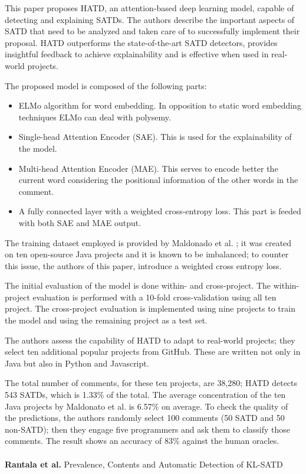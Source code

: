 This paper proposes HATD, an attention-based deep learning model, capable of detecting and explaining SATDs. The authors describe the important aspects of SATD that need to be analyzed and taken care of to successfully implement their proposal. HATD outperforms the state-of-the-art SATD detectors, provides insightful feedback to achieve explainability and is effective when used in real-world projects.

The proposed model is composed of the following parts:
\begin{itemize}
    \item ELMo algorithm for word embedding. In opposition to static word embedding techniques ELMo can deal with polysemy.
    \item Single-head Attention Encoder (SAE). This is used for the explainability of the model.
    \item Multi-head Attention Encoder (MAE). This serves to encode better the current word considering the positional information of the other words in the comment.
    \item A fully connected layer with a weighted cross-entropy loss. This part is feeded with both SAE and MAE output. 
\end{itemize}

The training dataset employed is provided by Maldonado et al. \cite{maldonado2017using}; it was created on ten open-source Java projects and it is known to be imbalanced; to counter this issue, the authors of this paper, introduce a weighted cross entropy loss. 

The initial evaluation of the model is done within- and cross-project. The within-project evaluation is performed with a 10-fold cross-validation using all ten project. The cross-project evaluation is implemented using nine projects to train the model and using the remaining project as a test set.

The authors assess the capability of HATD to adapt to real-world projects; they select ten additional popular projects from GitHub. These are written not only in Java but also in Python and Javascript. 

The total number of comments, for these ten projects, are 38,280; HATD detects 543 SATDs, which is 1.33\% of the total. The average concentration of the ten Java projects by Maldonato et al. is 6.57\% on average.
To check the quality of the predictions, the authors randomly select 100 comments (50 SATD and 50 non-SATD); then they engage five programmers and ask them to classify those comments. The result shows an accuracy of 83\% against the human oracles.
\\
\\
\textbf{Rantala et al.} \cite{rantala2020prevalence} Prevalence, Contents and Automatic Detection of KL-SATD

